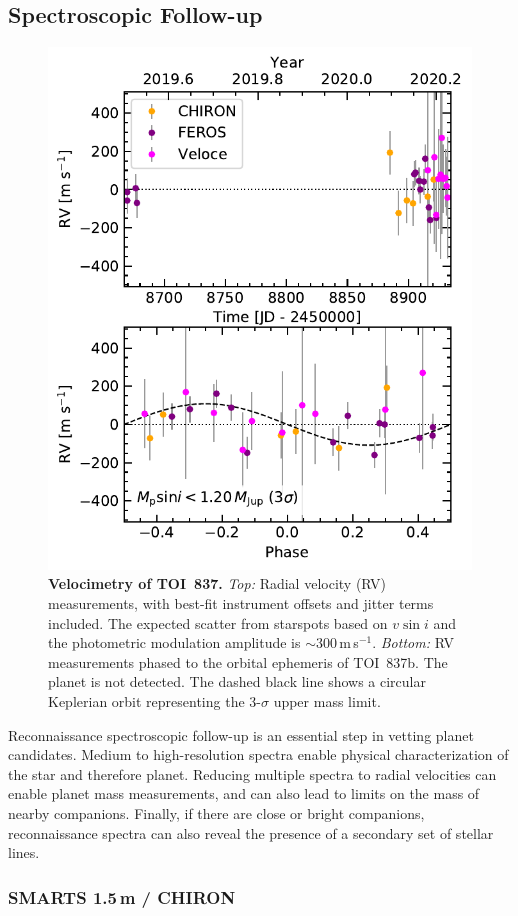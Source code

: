 \documentclass[12pt,twocolumn,tighten]{aastex63}
\newcommand{\tn}{TOI~837} %
\newcommand{\pn}{TOI~837b} %
\begin{document}



\subsection{Spectroscopic Follow-up}
\label{subsec:spectra}

\begin{figure}[!t]
	\begin{center}
		\leavevmode
		\includegraphics[width=.48\textwidth]{f5.pdf}
	\end{center}
	\vspace{-0.7cm}
	\caption{
    {\bf Velocimetry of \tn.} {\it Top:} Radial velocity (RV)
    measurements, with best-fit instrument offsets and jitter terms
    included.  The expected scatter from starspots based on $v\sin i$
    and the photometric modulation amplitude is
    $\sim$300$\,$m$\,$s$^{-1}$.  {\it Bottom:} RV measurements phased
    to the orbital ephemeris of \pn.  The planet is not detected.  The
    dashed black line shows a circular Keplerian orbit representing
    the 3-$\sigma$ upper mass limit.
    \label{fig:rvs}
	}
\end{figure}

Reconnaissance spectroscopic follow-up is an essential step in vetting
planet candidates.  Medium to high-resolution spectra enable physical
characterization of the star and therefore planet.  Reducing multiple
spectra to radial velocities can enable planet mass measurements, and
can also lead to limits on the mass of nearby companions.  Finally, if
there are close or bright companions, reconnaissance spectra can also
reveal the presence of a secondary set of stellar lines.

\subsubsection{SMARTS 1.5$\,$m / CHIRON}
\label{subsec:chiron}
\end{document}

